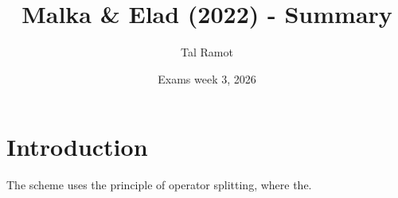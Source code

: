 \documentclass[11pt]{article}
\title{Malka \& Elad (2022) - Summary}
\author{Tal Ramot}
\date{Exams week 3, 2026}
\begin{document}
\maketitle
\section{Introduction}
The scheme uses the principle of operator splitting, where the.

\subsection{}
\end{document}
